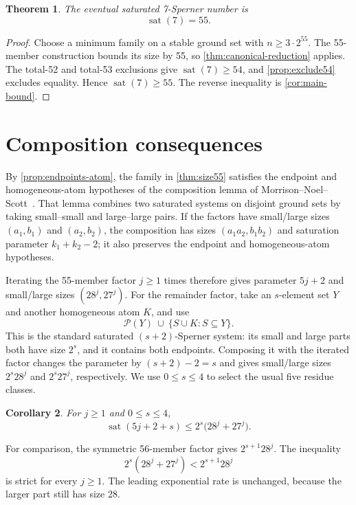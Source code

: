 \documentclass[a4paper,fleqn,longmktitle]{cas-sc}
\newtheorem{theorem}{Theorem}[section]
\newtheorem{corollary}[theorem]{Corollary}
\theoremstyle{definition}
\theoremstyle{remark}
\newcommand{\powerset}{\mathcal{P}}
\newcommand{\sat}{\operatorname{sat}}
\begin{document}
\begin{theorem}
\label{thm:sat7}
The eventual saturated 7-Sperner number is
\[
  \sat(7)=55.
\]
\end{theorem}

\begin{proof}
Choose a minimum family on a stable ground set with
$n\geq3\cdot2^{55}$.  The 55-member construction bounds its size by 55, so
\cref{thm:canonical-reduction} applies.  The total-52 and total-53 exclusions
give $\sat(7)\geq54$, and \cref{prop:exclude54} excludes equality.  Hence
$\sat(7)\geq55$.
The reverse inequality is \cref{cor:main-bound}.
\end{proof}

\section{Composition consequences}
\label{sec:composition}

By \cref{prop:endpoints-atom}, the family in \cref{thm:size55} satisfies the
endpoint and homogeneous-atom hypotheses of the composition lemma of
Morrison--Noel--Scott~\cite[Lemma~18]{mns2014}.  That lemma combines two saturated
systems on disjoint ground sets by taking small--small and large--large
pairs.  If the factors have small/large sizes $(a_1,b_1)$ and $(a_2,b_2)$,
the composition has sizes $(a_1a_2,b_1b_2)$ and saturation parameter
$k_1+k_2-2$; it also preserves the endpoint and homogeneous-atom hypotheses.

Iterating the 55-member factor $j\geq1$ times therefore gives parameter
$5j+2$ and small/large sizes $(28^j,27^j)$.  For the remainder factor, take
an $s$-element set $Y$ and another homogeneous atom $K$, and use
\[
  \powerset(Y)\ \cup\ \{S\cup K:S\subseteq Y\}.
\]
This is the standard saturated $(s+2)$-Sperner system: its small and large
parts both have size $2^s$, and it contains both endpoints.  Composing it with
the iterated factor changes the parameter by
$(s+2)-2=s$ and gives small/large sizes
$2^s28^j$ and $2^s27^j$, respectively.  We use $0\leq s\leq4$ to select the
usual five residue classes.

\begin{corollary}
\label{cor:discrete-bound}
For $j\geq1$ and $0\leq s\leq4$,
\[
  \sat(5j+2+s)\leq 2^s\bigl(28^j+27^j\bigr).
\]
\end{corollary}

For comparison, the symmetric 56-member factor gives
$2^{s+1}28^j$.  The inequality
\[
  2^s(28^j+27^j)<2^{s+1}28^j
\]
is strict for every $j\geq1$.  The leading exponential rate is unchanged,
because the larger part still has size 28.
\end{document}
